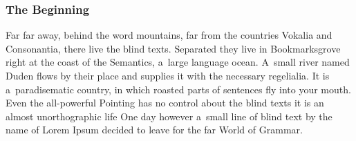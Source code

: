 \subsubsection{The Beginning}
\label{sec:tests:lorem-ipsum:beginning}
Far far away, behind the word mountains, far from the countries Vokalia and Consonantia, there live the blind texts. Separated they live in Bookmarksgrove right at the coast of the Semantics, a~large language ocean. A~small river named Duden flows by their place and supplies it with the necessary regelialia. It is a~paradisematic country, in which roasted parts of sentences fly into your mouth. Even the all-powerful Pointing has no control about the blind texts it is an almost unorthographic life One day however a~small line of blind text by the name of Lorem Ipsum decided to leave for the far World of Grammar.

